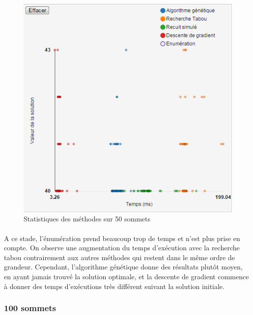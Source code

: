 \documentclass[12pt]{article}
\begin{document}
\begin{figure}[H]
	\begin{center}
	\includegraphics[scale=0.5]{pictures/results/20sommets.png}
	\end{center}
	\caption{Statistiques des méthodes sur 50 sommets \label{fig:50nodeResult}}
\end{figure}
\paragraph{}A ce stade, l'énumération prend beaucoup trop de temps et n'est plus prise en compte. On observe une augmentation du temps d'exécution avec la recherche tabou contrairement aux autres méthodes qui restent dans le même ordre de grandeur. Cependant, l'algorithme génétique donne des résultats plutôt moyen, en ayant jamais trouvé la solution optimale, et la descente de gradient commence à donner des temps d'exécutions très différent suivant la solution initiale.

\subsubsection{100 sommets}
\end{document}
